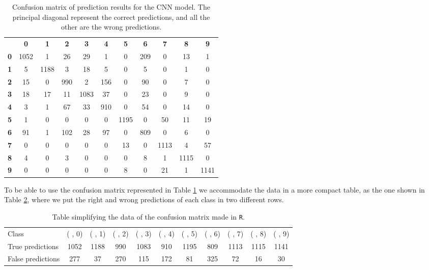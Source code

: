 \documentclass{article}
\begin{document}
\begin{table}[]\caption{Confusion matrix of prediction results for the CNN model. The principal diagonal represent the correct predictions, and all the other are the wrong predictions.}\label{tab3}
\centering
\begin{tabular}{ c c c c c c c c c c c }
	&	\textbf{0}	&	\textbf{1}	&	\textbf{2}	&	\textbf{3}	&	\textbf{4}	&	\textbf{5}	&	\textbf{6}	&	\textbf{7}	&	\textbf{8}	&	\textbf{9}	\\
\textbf{0}	&	1052	&	1	&	26	&	29	&	1	&	0	&	209	&	0	&	13	&	1	\\
\textbf{1}	&	5	&	1188	&	3	&	18	&	5	&	0	&	5	&	0	&	1	&	0	\\
\textbf{2}	&	15	&	0	&	990	&	2	&	156	&	0	&	90	&	0	&	7	&	0	\\
\textbf{3}	&	18	&	17	&	11	&	1083	&	37	&	0	&	23	&	0	&	9	&	0	\\
\textbf{4}	&	3	&	1	&	67	&	33	&	910	&	0	&	54	&	0	&	14	&	0	\\
\textbf{5}	&	1	&	0	&	0	&	0	&	0	&	1195	&	0	&	50	&	11	&	19	\\
\textbf{6}	&	91	&	1	&	102	&	28	&	97	&	0	&	809	&	0	&	6	&	0	\\
\textbf{7}	&	0	&	0	&	0	&	0	&	0	&	13	&	0	&	1113	&	4	&	57	\\
\textbf{8}	&	4	&	0	&	3	&	0	&	0	&	0	&	8	&	1	&	1115	&	0	\\
\textbf{9}	&	0	&	0	&	0	&	0	&	0	&	8	&	0	&	21	&	1	&	1141	\\
\end{tabular}
\end{table}

To be able to use the confusion matrix represented in Table \ref{tab3} we accommodate the data in a more compact table, as the one shown in Table \ref{tab4}, where we put the right and wrong predictions of each class in two different rows. \\

\begin{table}[]\caption{Table simplifying the data of the confusion matrix made in \texttt{R}.}\label{tab4}
\centering
\begin{tabular}{ p{1.5cm} c c c c c c c c c c }
Class	&	( , 0)	&	( , 1)	&	( , 2)	&	( , 3)	&	( , 4)	&	( , 5)	&	( , 6)	&	( , 7)	&	( , 8)	&	( , 9)	\\
True predictions	&	1052	&	1188	&	990	&	1083	&	910	&	1195	&	809	&	1113	&	1115	&	1141	\\
False predictions	&	277	&	37	&	270	&	115	&	172	&	81	&	325	&	72	&	16	&	30	\\
\end{tabular}
\end{table}
\end{document}
